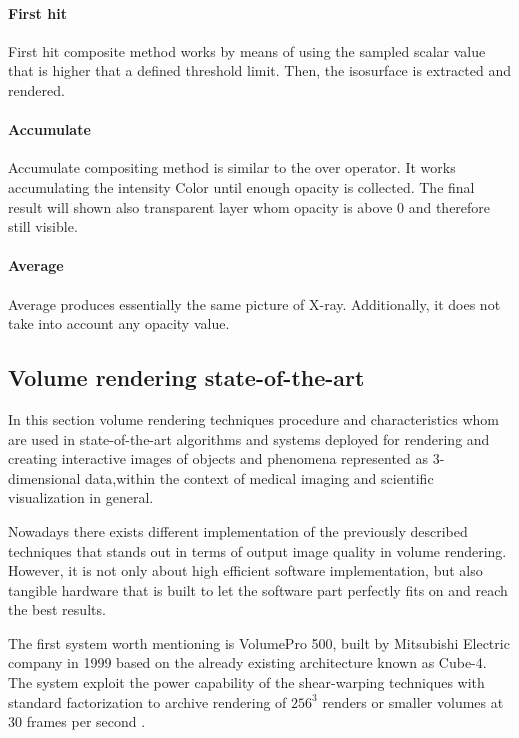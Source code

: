 \documentclass[12pt,a4paper]{extarticle}
\newcommand{\linespace}{\vspace{8pt}}
\begin{document}
\paragraph{First hit} First hit composite method works by means of using the sampled scalar value that is higher that a defined threshold limit. Then, the isosurface is extracted and rendered.

\paragraph{Accumulate} Accumulate compositing method is similar to the over operator. It works accumulating the intensity Color until enough opacity is collected. The final result will shown also transparent layer whom opacity is above 0 and 
therefore still visible.

\paragraph{Average} Average produces essentially the same picture of X-ray. Additionally, it does not take into account any opacity value.

\subsection{Volume rendering state-of-the-art} 

In this section volume rendering techniques procedure and characteristics whom are used in state-of-the-art algorithms and systems deployed for rendering and creating interactive images of objects and phenomena represented as 3-dimensional data,within the context of medical imaging and scientific visualization in general. 

Nowadays there exists different implementation of the previously described techniques that stands out in terms of output image quality in volume rendering. However, it is not only about high efficient software implementation, but also tangible hardware that is built to let the software part perfectly fits on and reach the best results.
\linespace

The first system worth mentioning is VolumePro 500, built by Mitsubishi Electric company in 1999 based on the already existing architecture known as Cube-4. The system exploit the power capability of the shear-warping techniques with standard factorization to archive rendering of $256^3$ renders or smaller volumes at 30 frames per second  \cite{Pfister:1999:VRR:311535.311563}. 
\end{document}
